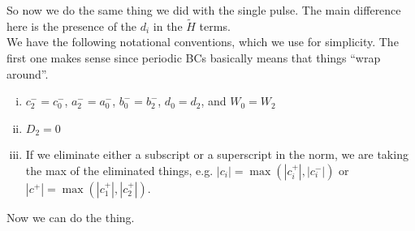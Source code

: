 \documentclass[12pt]{article}
\begin{document}
So now we do the same thing we did with the single pulse. The main difference here is the presence of the $d_i$ in the $\tilde{H}$ terms. \\

We have the following notational conventions, which we use for simplicity. The first one makes sense since periodic BCs basically means that things ``wrap around''.

\begin{enumerate}[(i)]
\item $c_2^- = c_0^-$, $a_2^- = a_0^-$, $b_0^- = b_2^-$, $d_0 = d_2$, and $W_0 = W_2$
\item $D_2 = 0$
\item If we eliminate either a subscript or a superscript in the norm, we are taking the max of the eliminated things, e.g. $|c_i| = \max(|c_i^+|, |c_i^-|)$ or $|c^+| = \max(|c_1^+|, |c_2^+|)$. 
\end{enumerate}

Now we can do the thing.
\end{document}
